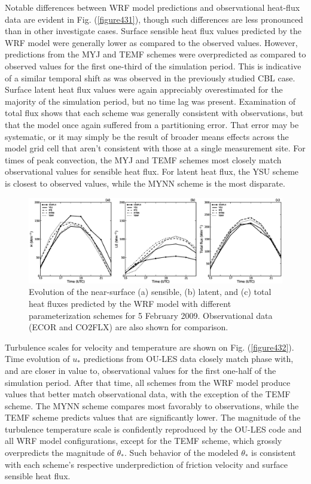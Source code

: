 Notable differences between WRF model predictions and observational heat-flux data are evident in Fig. (\autoref{figure431}), though such differences are less pronounced than in other investigate cases. Surface sensible heat flux values predicted by the WRF model were generally lower as compared to the observed values. However, predictions from the MYJ and TEMF schemes were overpredicted as compared to observed values for the first one-third of the simulation period. This is indicative of a similar temporal shift as was observed in the previously studied CBL case. Surface latent heat flux values were again appreciably overestimated for the majority of the simulation period, but no time lag was present. Examination of total flux shows that each scheme was generally consistent with observations, but that the model once again suffered from a partitioning error. That error may be systematic, or it may simply be the result of broader means effects across the model grid cell that aren't consistent with those at a single measurement site. For times of peak convection, the MYJ and TEMF schemes most closely match observational values for sensible heat flux. For latent heat flux, the YSU scheme is closest to observed values, while the MYNN scheme is the most disparate. 


\begin{figure}[ht!]
\begin{center}
\includegraphics[width=\textwidth]{figures/chapter4/shf_lhf_phys_20090205}
\end{center}
\caption{Evolution of the near-surface (a) sensible, (b) latent, and (c) total heat fluxes predicted by the WRF model with different parameterization schemes for 5 February 2009. Observational data (ECOR and CO2FLX) are also shown for comparison.}
\label{figure431}
\end{figure}


Turbulence scales for velocity and temperature are shown on Fig. (\autoref{figure432}). Time evolution of $u_*$ predictions from OU-LES data closely match phase with, and are closer in value to, observational values for the first one-half of the simulation period. After that time, all schemes from the WRF model produce values that better match observational data, with the exception of the TEMF scheme. The MYNN scheme compares most favorably to observations, while the TEMF scheme predicts values that are significantly lower. The magnitude of the turbulence temperature scale is confidently reproduced by the OU-LES code and all WRF model configurations, except for the TEMF scheme, which grossly overpredicts the magnitude of $\theta_*$. Such behavior of the modeled $\theta_*$ is consistent with each scheme's respective underprediction of friction velocity and surface sensible heat flux.



